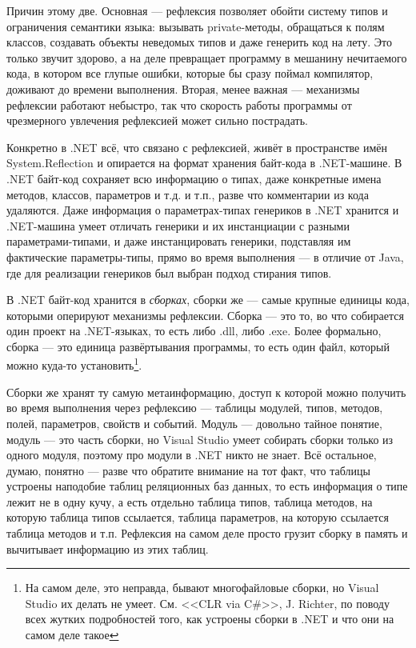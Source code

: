 \documentclass{../../text-style}
\begin{document}
Причин этому две. Основная --- рефлексия позволяет обойти систему типов и ограничения семантики языка: вызывать private-методы, обращаться к полям классов, создавать объекты неведомых типов и даже генерить код на лету. Это только звучит здорово, а на деле превращает программу в мешанину нечитаемого кода, в котором все глупые ошибки, которые бы сразу поймал компилятор, доживают до времени выполнения. Вторая, менее важная --- механизмы рефлексии работают небыстро, так что скорость работы программы от чрезмерного увлечения рефлексией может сильно пострадать.

Конкретно в .NET всё, что связано с рефлексией, живёт в пространстве имён System.Reflection и опирается на формат хранения байт-кода в .NET-машине. В .NET байт-код сохраняет всю информацию о типах, даже конкретные имена методов, классов, параметров и т.д. и т.п., разве что комментарии из кода удаляются. Даже информация о параметрах-типах генериков в .NET хранится и .NET-машина умеет отличать генерики и их инстанциации с разными параметрами-типами, и даже инстанцировать генерики, подставляя им фактические параметры-типы, прямо во время выполнения --- в отличие от Java, где для реализации генериков был выбран подход стирания типов.

В .NET байт-код хранится в \textit{сборках}, сборки же --- самые крупные единицы кода, которыми оперируют механизмы рефлексии. Сборка --- это то, во что собирается один проект на .NET-языках, то есть либо .dll, либо .exe. Более формально, сборка --- это единица развёртывания программы, то есть один файл, который можно куда-то установить\footnote{На самом деле, это неправда, бывают многофайловые сборки, но Visual Studio их делать не умеет. См. <<CLR via C\#>>, J. Richter, по поводу всех жутких подробностей того, как устроены сборки в .NET и что они на самом деле такое}.

Сборки же хранят ту самую метаинформацию, доступ к которой можно получить во время выполнения через рефлексию --- таблицы модулей, типов, методов, полей, параметров, свойств и событий. Модуль --- довольно тайное понятие, модуль --- это часть сборки, но Visual Studio умеет собирать сборки только из одного модуля, поэтому про модули в .NET никто не знает. Всё остальное, думаю, понятно --- разве что обратите внимание на тот факт, что таблицы устроены наподобие таблиц реляционных баз данных, то есть информация о типе лежит не в одну кучу, а есть отдельно таблица типов, таблица методов, на которую таблица типов ссылается, таблица параметров, на которую ссылается таблица методов и т.п. Рефлексия на самом деле просто грузит сборку в память и вычитывает информацию из этих таблиц.
\end{document}
